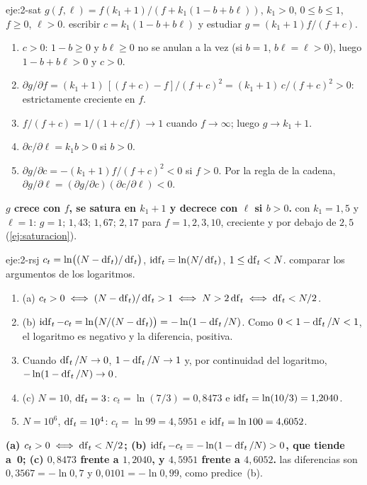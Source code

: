 \begin{solucion}{eje:2-sat}
\datos $g(f,\ell)=f(k_1+1)/(f+k_1(1-b+b\ell))$, $k_1>0$, $0\le b\le 1$, $f\ge 0$, $\ell>0$.
\planteamiento escribir $c=k_1(1-b+b\ell)$ y estudiar $g=(k_1+1)f/(f+c)$.
\pasos
\begin{enumerate}[label=\arabic*.]
  \item $c>0$: $1-b\ge 0$ y $b\ell\ge 0$ no se anulan a la vez (si $b=1$, $b\ell=\ell>0$), luego $1-b+b\ell>0$ y $c>0$.
  \item $\partial g/\partial f=(k_1+1)\,[(f+c)-f]/(f+c)^{2}=(k_1+1)\,c/(f+c)^{2}>0$: estrictamente creciente en $f$.
  \item $f/(f+c)=1/(1+c/f)\to 1$ cuando $f\to\infty$; luego $g\to k_1+1$.
  \item $\partial c/\partial\ell=k_1b>0$ si $b>0$.
  \item $\partial g/\partial c=-(k_1+1)f/(f+c)^{2}<0$ si $f>0$. Por la regla de la cadena, $\partial g/\partial\ell=(\partial g/\partial c)(\partial c/\partial\ell)<0$.
\end{enumerate}
\resultado \textbf{$g$ crece con $f$, se satura en $k_1+1$ y decrece con $\ell$ si $b>0$.}
\comprobacion con $k_1=1{,}5$ y $\ell=1$: $g=1;\,1{,}43;\,1{,}67;\,2{,}17$ para $f=1,2,3,10$, creciente y por debajo de $2{,}5$ (\cref{ej:saturacion}).
\end{solucion}

\begin{solucion}{eje:2-rsj}
\datos $c_t=\ln\bigl((N-\operatorname{df}_t)/\operatorname{df}_t\bigr)$, $\operatorname{idf}_t=\ln(N/\operatorname{df}_t)$, $1\le\operatorname{df}_t<N$.
\planteamiento comparar los argumentos de los logaritmos.
\pasos
\begin{enumerate}[label=\arabic*.]
  \item (a) $c_t>0\iff(N-\operatorname{df}_t)/\operatorname{df}_t>1\iff N>2\operatorname{df}_t\iff\operatorname{df}_t<N/2$.
  \item (b) $\operatorname{idf}_t-c_t=\ln\bigl(N/(N-\operatorname{df}_t)\bigr)=-\ln(1-\operatorname{df}_t/N)$. Como $0<1-\operatorname{df}_t/N<1$, el logaritmo es negativo y la diferencia, positiva.
  \item Cuando $\operatorname{df}_t/N\to 0$, $1-\operatorname{df}_t/N\to 1$ y, por continuidad del logaritmo, $-\ln(1-\operatorname{df}_t/N)\to 0$.
  \item (c) $N=10$, $\operatorname{df}_t=3$: $c_t=\ln(7/3)=0{,}8473$ e $\operatorname{idf}_t=\ln(10/3)=1{,}2040$.
  \item $N=10^{6}$, $\operatorname{df}_t=10^{4}$: $c_t=\ln 99=4{,}5951$ e $\operatorname{idf}_t=\ln 100=4{,}6052$.
\end{enumerate}
\resultado \textbf{(a) $c_t>0\iff\operatorname{df}_t<N/2$; (b) $\operatorname{idf}_t-c_t=-\ln(1-\operatorname{df}_t/N)>0$, que tiende a~0; (c) $0{,}8473$ frente a $1{,}2040$, y $4{,}5951$ frente a $4{,}6052$.}
\comprobacion las diferencias son $0{,}3567=-\ln 0{,}7$ y $0{,}0101=-\ln 0{,}99$, como predice~(b).
\end{solucion}

